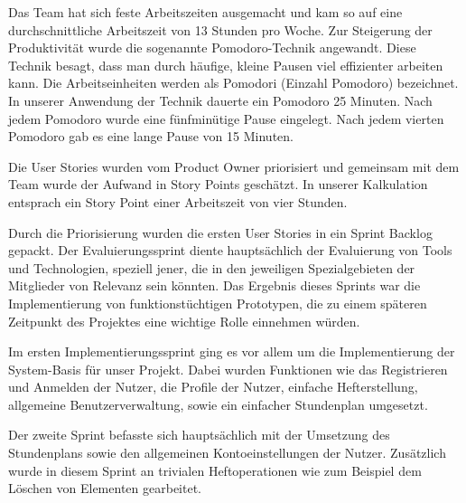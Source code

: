 
Das Team hat sich feste Arbeitszeiten ausgemacht und kam so auf eine durchschnittliche Arbeitszeit von 13 Stunden pro Woche. Zur Steigerung der Produktivität wurde die sogenannte Pomodoro-Technik \cite{POMOT} angewandt. Diese Technik besagt, dass man durch häufige, kleine Pausen viel effizienter arbeiten kann. Die Arbeitseinheiten werden als Pomodori (Einzahl Pomodoro) bezeichnet. In unserer Anwendung der Technik dauerte ein Pomodoro 25 Minuten. Nach jedem Pomodoro wurde eine fünfminütige Pause eingelegt. Nach jedem vierten Pomodoro gab es eine lange Pause von 15 Minuten.


Die User Stories wurden vom Product Owner priorisiert und gemeinsam mit dem Team wurde der Aufwand in Story Points geschätzt. In unserer Kalkulation entsprach ein Story Point einer Arbeitszeit von vier Stunden. 

Durch die Priorisierung wurden die ersten User Stories in ein Sprint Backlog gepackt. Der Evaluierungssprint diente hauptsächlich der Evaluierung von Tools und Technologien, speziell jener, die in den jeweiligen Spezialgebieten der Mitglieder von Relevanz sein könnten. Das Ergebnis dieses Sprints war die Implementierung von funktionstüchtigen Prototypen, die zu einem späteren Zeitpunkt des Projektes eine wichtige Rolle einnehmen würden.


\newpage

Im ersten Implementierungssprint ging es vor allem um die Implementierung der System-Basis für unser Projekt. Dabei wurden Funktionen wie das Registrieren und Anmelden der Nutzer, die Profile der Nutzer, einfache Hefterstellung, allgemeine Benutzerverwaltung, sowie ein einfacher Stundenplan umgesetzt.


Der zweite Sprint befasste sich hauptsächlich mit der Umsetzung des Stundenplans sowie den allgemeinen Kontoeinstellungen der Nutzer. Zusätzlich wurde in diesem Sprint an trivialen Heftoperationen wie zum Beispiel dem Löschen von Elementen gearbeitet.

